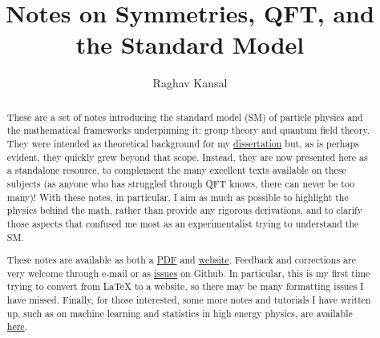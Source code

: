 \documentclass[12pt]{report}
\title{Notes on Symmetries, QFT, and the Standard Model}
\author{Raghav Kansal}
\theoremstyle{definition}
\theoremstyle{definition}
\theoremstyle{definition}
\numberwithin{equation}{chapter}
\begin{document}

\maketitle

\begin{abstract}
\begin{doublespace}
\setlength{\parskip}{\baselineskip}
These are a set of notes introducing the standard model (SM) of particle physics and the mathematical frameworks underpinning it: group theory and quantum field theory.
They were intended as theoretical background for my \href{https://www.raghavkansal.com}{dissertation} but, as is perhaps evident, they quickly grew beyond that scope.
Instead, they are now presented here as a standalone resource, to complement the many excellent texts available on these subjects (as anyone who has struggled through QFT knows, there can never be too many)!
With these notes, in particular, I aim as much as possible to highlight the physics behind the math, rather than provide any rigorous derivations, and to clarify those aspects that confused me most as an experimentalist trying to understand the SM.

These notes are available as both a \href{google.com}{PDF} and \href{https://rkansal47.github.io/standard-model}{website}.
Feedback and corrections are very welcome through e-mail or as \href{google.com}{issues} on Github.
In particular, this is my first time trying to convert from LaTeX to a website, so there may be many formatting issues I have missed.
Finally, for those interested, some more notes and tutorials I have written up, such as on machine learning and statistics in high energy physics, are available \href{https://www.raghavkansal.com/teaching/}{here}.
\end{doublespace}
\end{abstract}


{
\hypersetup{linkcolor=black}
\tableofcontents
}

\setlength{\parskip}{\baselineskip}

\begin{doublespace}




\end{doublespace}

\nocite{apsrev42Control}

 
\end{document}
